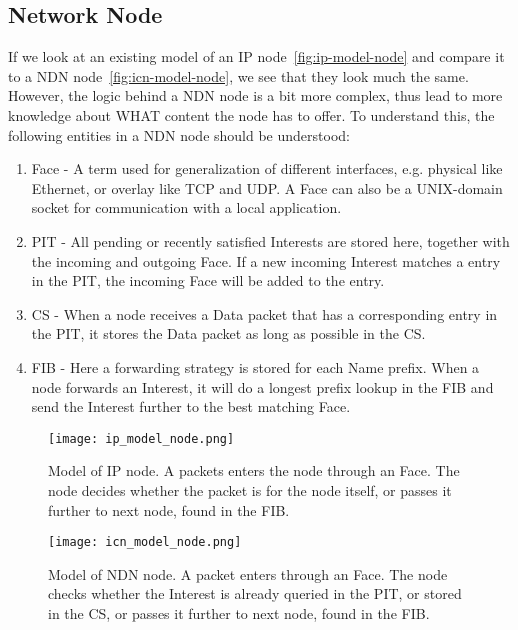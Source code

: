 \subsection{Network Node}
If we look at an existing model of an \gls{IP} node~\autoref{fig:ip-model-node} and compare it to a \gls{NDN} node~\autoref{fig:icn-model-node}, we see that they look much the same.
However, the logic behind a \gls{NDN} node is a bit more complex, thus lead to more knowledge about WHAT content the node has to offer.
To understand this, the following entities in a \gls{NDN} node should be understood:
\begin{enumerate}
  \item Face - A term used for generalization of different interfaces, e.g. physical like Ethernet, or overlay like \gls{TCP} and \gls{UDP}. A Face can also be a UNIX-domain socket for communication with a local application.
  \item \gls{PIT} - All pending or recently satisfied Interests are stored here, together with the incoming and outgoing Face.
  If a new incoming Interest matches a entry in the \gls{PIT}, the incoming Face will be added to the entry. 
  \item \gls{CS} - When a node receives a Data packet that has a corresponding entry in the \gls{PIT}, it stores the Data packet as long as possible in the \gls{CS}. 
  \item \gls{FIB} - Here a forwarding strategy is stored for each Name prefix. 
  When a node forwards an Interest, it will do a longest prefix lookup in the \gls{FIB} and send the Interest further to the best matching Face.
\end{enumerate}

\begin{figure}[H]
  \centering
  \texttt{[image: ip\_model\_node.png]}
  \caption{Model of \gls{IP} node. A packets enters the node through an Face. 
  The node decides whether the packet is for the node itself, or passes it further to next node, found in the \gls{FIB}.}
  \label{fig:ip-model-node}
\end{figure}

\begin{figure}[H]
  \centering
  \texttt{[image: icn\_model\_node.png]}
  \caption{Model of \gls{NDN} node. A packet enters through an Face. 
  The node checks whether the Interest is already queried in the \gls{PIT}, or stored in the \gls{CS}, or passes it further to next node, found in the \gls{FIB}.}
  \label{fig:icn-model-node}
\end{figure}

